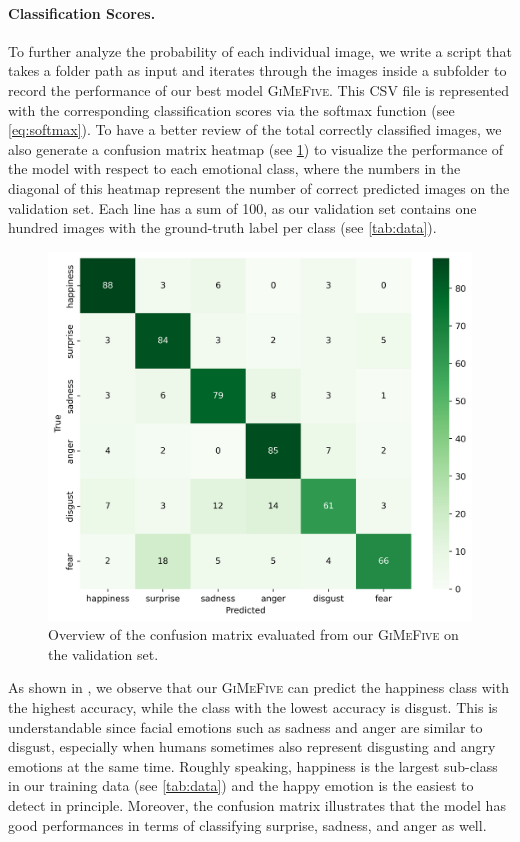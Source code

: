 \paragraph{Classification Scores.} 
To further analyze the probability of each individual image, 
we write a script that takes a folder path as input and iterates through the images inside a subfolder to record the performance of our best model \textsc{GiMeFive}. 
This CSV file is represented with the corresponding classification scores via the softmax function (see \cref{eq:softmax}). 
To have a better review of the total correctly classified images, 
we also generate a confusion matrix heatmap (see \cref{fig:matval}) to visualize the performance of the model with respect to each emotional class, 
where the numbers in the diagonal of this heatmap represent the number of correct predicted images on the validation set. 
Each line has a sum of 100, 
as our validation set contains one hundred images with the ground-truth label per class (see \cref{tab:data}). 

\begin{figure}[ht]
  \centering
   \includegraphics[width=.9\linewidth]{matval.png}
   \caption{Overview of the confusion matrix evaluated from our \textsc{GiMeFive} on the validation set.} 
   \label{fig:matval}
\end{figure}

As shown in , 
we observe that our \textsc{GiMeFive} can predict the happiness class with the highest accuracy, 
while the class with the lowest accuracy is disgust. 
This is understandable since facial emotions such as sadness and anger are similar to disgust, 
especially when humans sometimes also represent disgusting and angry emotions at the same time. 
Roughly speaking, 
happiness is the largest sub-class in our training data (see \cref{tab:data}) and the happy emotion is the easiest to detect in principle. 
Moreover, 
the confusion matrix illustrates that the model has good performances in terms of classifying surprise, sadness, and anger as well. 

